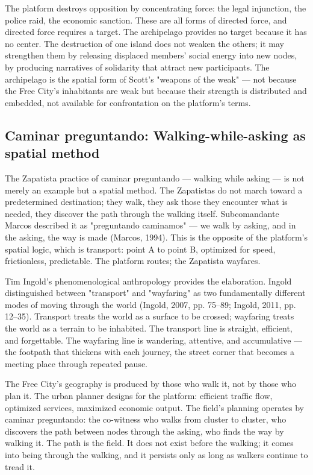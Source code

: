 The platform destroys opposition by concentrating force: the legal injunction, the police raid, the economic sanction. These are all forms of directed force, and directed force requires a target. The archipelago provides no target because it has no center. The destruction of one island does not weaken the others; it may strengthen them by releasing displaced members' social energy into new nodes, by producing narratives of solidarity that attract new participants. The archipelago is the spatial form of Scott's "weapons of the weak" — not because the Free City's inhabitants are weak but because their strength is distributed and embedded, not available for confrontation on the platform's terms.

\subsection{Caminar preguntando: Walking-while-asking as spatial method}

The Zapatista practice of caminar preguntando — walking while asking — is not merely an example but a spatial method. The Zapatistas do not march toward a predetermined destination; they walk, they ask those they encounter what is needed, they discover the path through the walking itself. Subcomandante Marcos described it as "preguntando caminamos" — we walk by asking, and in the asking, the way is made (Marcos, 1994). This is the opposite of the platform's spatial logic, which is transport: point A to point B, optimized for speed, frictionless, predictable. The platform routes; the Zapatista wayfares.

Tim Ingold's phenomenological anthropology provides the elaboration. Ingold distinguished between "transport" and "wayfaring" as two fundamentally different modes of moving through the world (Ingold, 2007, pp. 75–89; Ingold, 2011, pp. 12–35). Transport treats the world as a surface to be crossed; wayfaring treats the world as a terrain to be inhabited. The transport line is straight, efficient, and forgettable. The wayfaring line is wandering, attentive, and accumulative — the footpath that thickens with each journey, the street corner that becomes a meeting place through repeated pause.

The Free City's geography is produced by those who walk it, not by those who plan it. The urban planner designs for the platform: efficient traffic flow, optimized services, maximized economic output. The field's planning operates by caminar preguntando: the co-witness who walks from cluster to cluster, who discovers the path between nodes through the asking, who finds the way by walking it. The path is the field. It does not exist before the walking; it comes into being through the walking, and it persists only as long as walkers continue to tread it.

